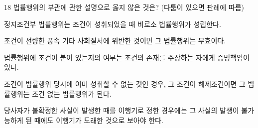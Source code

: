 \begin{question}{18}
법률행위의 부관에 관한 설명으로 옳지 않은 것은? (다툼이 있으면 판례에 따름)
\begin{choices}
  \item 정지조건부 법률행위는 조건이 성취되었을 때 비로소 법률행위가 성립한다.
  \item 조건이 선량한 풍속 기타 사회질서에 위반한 것이면 그 법률행위는 무효이다.
  \item 법률행위에 조건이 붙어 있는지의 여부는 조건의 존재를 주장하는 자에게 증명책임이 있다.
  \item 조건이 법률행위 당시에 이미 성취할 수 없는 것인 경우, 그 조건이 해제조건이면 그 법률행위는 조건 없는 법률행위가 된다.
  \item 당사자가 불확정한 사실이 발생한 때를 이행기로 정한 경우에는 그 사실의 발생이 불가능하게 된 때에도 이행기가 도래한 것으로 보아야 한다.
\end{choices}
\end{question}
